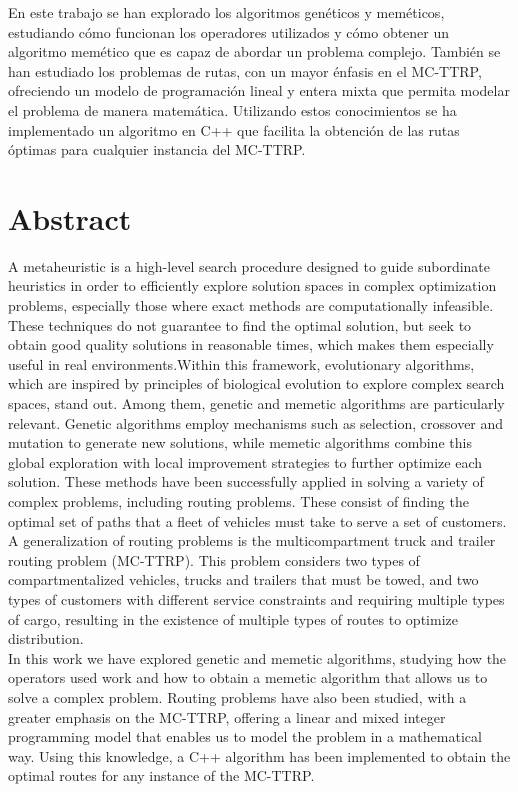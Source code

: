 \documentclass[11pt,a4paper]{book}
\theoremstyle{definition}
\theoremstyle{remark}
\begin{document}
En este trabajo se han explorado los algoritmos genéticos y meméticos, estudiando cómo funcionan los operadores utilizados y cómo obtener un algoritmo memético que es capaz de abordar un problema complejo. También se han estudiado los problemas de rutas, con un mayor énfasis en el MC-TTRP, ofreciendo un modelo de programación lineal y entera mixta que permita modelar el problema de manera matemática. Utilizando estos conocimientos se ha implementado un algoritmo en C++ que facilita la obtención de las rutas óptimas para cualquier instancia del MC-TTRP. 




\vspace{1.5cm}

\section*{Abstract}

A metaheuristic is a high-level search procedure designed to guide subordinate heuristics in order to efficiently explore solution spaces in complex optimization problems, especially those where exact methods are computationally infeasible. These techniques do not guarantee to find the optimal solution, but seek to obtain good quality solutions in reasonable times, which makes them especially useful in real environments.Within this framework, evolutionary algorithms, which are inspired by principles of biological evolution to explore complex search spaces, stand out. Among them, genetic and memetic algorithms are particularly relevant. Genetic algorithms employ mechanisms such as selection, crossover and mutation to generate new solutions, while memetic algorithms combine this global exploration with local improvement strategies to further optimize each solution. These methods have been successfully applied in solving a variety of complex problems, including routing problems. These consist of finding the optimal set of paths that a fleet of vehicles must take to serve a set of customers. A generalization of routing problems is the multicompartment truck and trailer routing problem (MC-TTRP). This problem considers two types of compartmentalized vehicles, trucks and trailers that must be towed, and two types of customers with different service constraints and requiring multiple types of cargo, resulting in the existence of multiple types of routes to optimize distribution.\\

In this work we have explored genetic and memetic algorithms, studying how the operators used work and how to obtain a memetic algorithm that allows us to solve a complex problem. Routing problems have also been studied, with a greater emphasis on the MC-TTRP, offering a linear and mixed integer programming model that enables us to model the problem in a mathematical way. Using this knowledge, a C++ algorithm has been implemented to obtain the optimal routes for any instance of the MC-TTRP.
\end{document}
